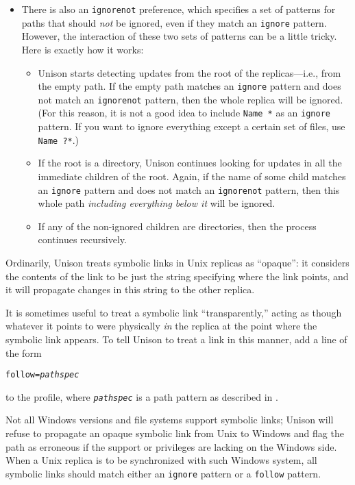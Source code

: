 \documentclass{article}
\newcommand{\ARG}[1]{\texttt{\textit{#1}}}
\begin{document}
\begin{itemize}
\item There is also an \verb|ignorenot| preference, which specifies a set of
  patterns for paths that should {\em not} be ignored, even if they match an
  \verb|ignore| pattern.  However, the interaction of these two sets of
  patterns can be a little tricky.  Here is exactly how it works:
  \begin{itemize}
  \item Unison starts detecting updates from the root of the
  replicas---i.e., from the empty path.  If the empty path matches an
  \verb|ignore| pattern and does not match an \verb|ignorenot| pattern, then
  the whole replica will be ignored.  (For this reason, it is not a good
  idea to include \verb|Name *| as an \verb|ignore| pattern.  If you want to
  ignore everything except a certain set of files, use \verb|Name ?*|.)
  \item If the root is a directory, Unison continues looking for updates in
  all the immediate children of the root.  Again, if the name of some child matches an
  \verb|ignore| pattern and does not match an \verb|ignorenot| pattern, then
  this whole path {\em including everything below it} will be ignored.
  \item If any of the non-ignored children are directories, then the process
  continues recursively.
  \end{itemize}
\end{itemize}


Ordinarily, Unison treats symbolic links in Unix replicas as
``opaque'': it considers the contents of the link to be just the
string specifying where the link points, and it will propagate changes in
this string to the other replica.

It is sometimes useful to treat a symbolic link ``transparently,''
acting as though whatever it points to were physically {\em in} the
replica at the point where the symbolic link appears.  To tell Unison
to treat a link in this manner, add a line of the form
\begin{alltt}
             follow = \ARG{pathspec}
\end{alltt}
to the profile, where \ARG{pathspec} is a path pattern as described in
.

Not all Windows versions and file systems support symbolic links; Unison will
refuse to propagate an opaque symbolic link from Unix to Windows and flag the
path as erroneous if the support or privileges are lacking on the Windows side.
When a Unix replica is to be synchronized with such Windows system, all symbolic
links should match either an \verb|ignore| pattern or a \verb|follow| pattern.
\end{document}
